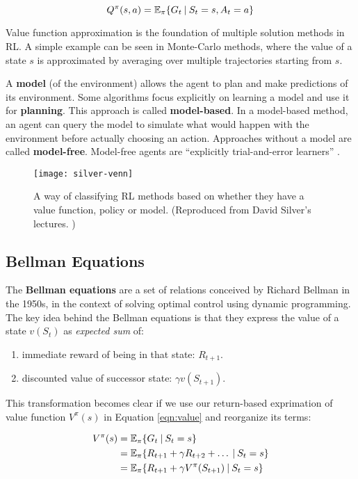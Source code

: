 \begin{equation}
    Q^{\pi}(s, a) = \mathbb{E}_{\pi}\{ G_t \:\vert\: S_t = s, A_t = a \}
\end{equation}

Value function approximation is the foundation of multiple solution methods in RL. A simple example can be seen in Monte-Carlo methods, where the value of a state \(s\) is approximated by averaging over multiple trajectories starting from \(s\).

A \textbf{model} (of the environment) allows the agent to plan and make predictions of its environment.
Some algorithms focus explicitly on learning a model and use it for \textbf{planning}.
This approach is called \textbf{model-based}.
In a model-based method, an agent can query the model to simulate what would happen with the environment before actually choosing an action.
Approaches without a model are called \textbf{model-free}. Model-free agents are ``explicitly trial-and-error learners'' \cite{rlai}.

\begin{figure}[ht]
    \caption{A way of classifying RL methods based on whether they have a value function, policy or model. (Reproduced from David Silver's lectures. \cite{silver-lectures})}
    \vspace*{0.2cm}
    \centering
    \texttt{[image: silver-venn]}
\end{figure}

\subsection{Bellman Equations} \label{rl:bellman}
The \textbf{Bellman equations} are a set of relations conceived by Richard Bellman in the 1950s, in the context of solving optimal control using dynamic programming.
The key idea behind the Bellman equations is that they express the value of a state $v(S_{t})$ as \emph{expected sum} of:
\begin{enumerate}
    \item immediate reward of being in that state: $R_{t+1}$.
    \item discounted value of successor state: $\gamma v(S_{t+1})$.
\end{enumerate}

This transformation becomes clear if we use our return-based exprimation of value function $V^{\pi}(s)$ in Equation \ref{eqn:value} and reorganize its terms:

\begin{equation} \label{eqn:bellman-expectation}
\begin{aligned}
    V^{\pi}(s)
        &= \mathbb{E}_{\pi}\{ G_t \:\vert\: S_t = s \} \\
        &= \mathbb{E}_{\pi}\{ R_{t+1} + \gamma R_{t+2} + \dots \:\vert\: S_t = s \} \\
        &= \mathbb{E}_{\pi}\{ R_{t+1} + \gamma V^{\pi}(S_{t+1}) \:\vert\: S_{t} = s \} \\
\end{aligned}
\end{equation}


